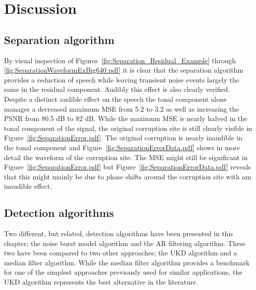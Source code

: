 \section{Discussion}\label{sec:WPdiscussion}
\subsection{Separation algorithm}

By visual inspection of Figures~\ref{fig:Separation_Residual_Example} through \ref{fig:SeparationWaveformExBig640.pdf} it is clear that the separation algorithm provides a reduction of speech while leaving transient noise events largely the same in the residual component. Audibly this effect is also clearly verified. Despite a distinct audible effect on the speech the tonal component alone manages a decreased maximum MSE from 5.2 to 3.2 as well as increasing the PSNR from 80.5 dB to 82 dB. While the maximum MSE is nearly halved in the tonal component of the signal, the original corruption site is still clearly visible in Figure~\ref{fig:SeparationError.pdf}. The original corruption is nearly inaudible in the tonal component and Figure~\ref{fig:SeparationErrorData.pdf} shows in more detail the waveform of the corruption site. The MSE might still be significant in Figure~\ref{fig:SeparationError.pdf} but Figure~\ref{fig:SeparationErrorData.pdf} reveals that this might mainly be due to phase shifts around the corruption site with am inaudible effect.

\subsection{Detection algorithms}
Two different, but related, detection algorithms have been presented in this chapter; the noise burst model algorithm and the AR filtering algorithm. These two have been compared to two other approaches; the UKD algorithm\cite{Subramanya2007} and a median filter algorithm. While the median filter algorithm provides a benchmark for one of the simplest approaches previously used for similar applications, the UKD algorithm represents the best alternative in the literature.

